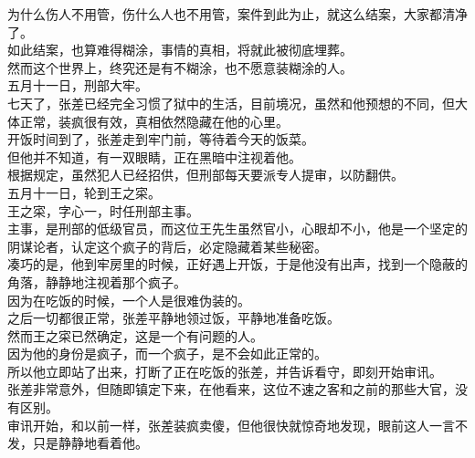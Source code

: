 \begin{multicols}{\theparacolNo}
为什么伤人不用管，伤什么人也不用管，案件到此为止，就这么结案，大家都清净了。\\

如此结案，也算难得糊涂，事情的真相，将就此被彻底埋葬。\\

然而这个世界上，终究还是有不糊涂，也不愿意装糊涂的人。\\

五月十一日，刑部大牢。\\

七天了，张差已经完全习惯了狱中的生活，目前境况，虽然和他预想的不同，但大体正常，装疯很有效，真相依然隐藏在他的心里。\\

开饭时间到了，张差走到牢门前，等待着今天的饭菜。\\

但他并不知道，有一双眼睛，正在黑暗中注视着他。\\

根据规定，虽然犯人已经招供，但刑部每天要派专人提审，以防翻供。\\

五月十一日，轮到王之寀。\\

王之寀，字心一，时任刑部主事。\\

主事，是刑部的低级官员，而这位王先生虽然官小，心眼却不小，他是一个坚定的阴谋论者，认定这个疯子的背后，必定隐藏着某些秘密。\\

凑巧的是，他到牢房里的时候，正好遇上开饭，于是他没有出声，找到一个隐蔽的角落，静静地注视着那个疯子。\\

因为在吃饭的时候，一个人是很难伪装的。\\

之后一切都很正常，张差平静地领过饭，平静地准备吃饭。\\

然而王之寀已然确定，这是一个有问题的人。\\

因为他的身份是疯子，而一个疯子，是不会如此正常的。\\

所以他立即站了出来，打断了正在吃饭的张差，并告诉看守，即刻开始审讯。\\

张差非常意外，但随即镇定下来，在他看来，这位不速之客和之前的那些大官，没有区别。\\

审讯开始，和以前一样，张差装疯卖傻，但他很快就惊奇地发现，眼前这人一言不发，只是静静地看着他。\\


\end{multicols}
